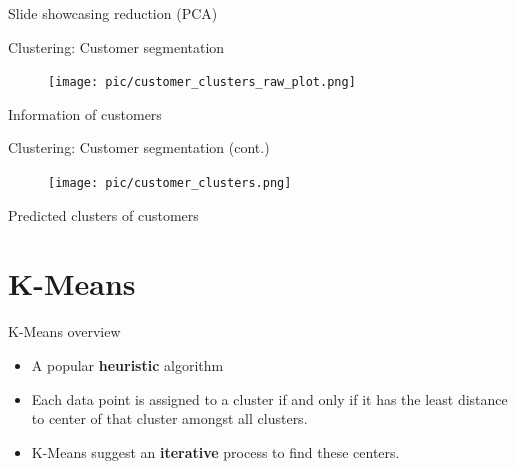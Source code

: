 \documentclass[serif, aspectratio=169]{beamer}
\begin{document}
\begin{frame}{Slide showcasing reduction (PCA)}
    
\end{frame}

\begin{frame}{Clustering: Customer segmentation}
    \begin{figure}
        \centering
        \texttt{[image: pic/customer\_clusters\_raw\_plot.png]}
    \end{figure}
    \begin{center}
        Information of customers
    \end{center}
\end{frame}

\begin{frame}{Clustering: Customer segmentation (cont.)}
    \begin{figure}
        \centering
        \texttt{[image: pic/customer\_clusters.png]}
    \end{figure}
    \begin{center}
        Predicted clusters of customers
    \end{center}
\end{frame}


\section{K-Means}
\begin{frame}{K-Means overview}
    \begin{itemize}
        \item   A popular \textbf{heuristic} algorithm
        \item Each data point is assigned to a cluster if and only if it has the least distance to center of that cluster amongst all clusters.
        \item K-Means suggest an \textbf{iterative} process to find these centers.
    \end{itemize}
\end{frame}
\end{document}
